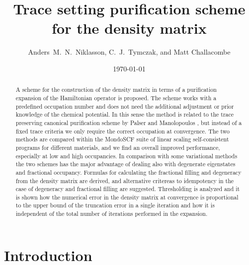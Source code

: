
\draft
\tighten
\twocolumn



\date{\today}

\title{Trace setting purification scheme for the density matrix}

\author{Anders~M.~N.~Niklasson, C.~J.~Tymczak, and Matt Challacombe}

\address{
Theoretical Division, Los Alamos National Laboratory,
Los Alamos, NM 87545, USA}

\maketitle

\begin{abstract}
A scheme for the construction of the density matrix in terms of
a purification expansion of the Hamiltonian operator is proposed. The scheme
works with a predefined occupation number and does not need
the additional adjustment or prior knowledge of the chemical potential.
In this sense the method is related to the trace preserving canonical 
purification scheme by Palser and Manolopoulos \cite{McWeeny60,Palser98}, 
but instead of a fixed trace criteria we only require the correct
occupation at convergence. The two methods are
compared within the MondoSCF suite of linear scaling self-consistent
programs for different materials, and we find an overall improved performance,
especially at low and high occupancies. In comparison
with some variational methods the two schemes has the major advantage of
dealing also with degenerate eigenstates and fractional occupancy. 
Formulas for calculating the fractional filling and degeneracy from 
the density matrix are derived, and alternative critereas to idempotency
in the case of degeneracy and fractional filling are suggested.
Thresholding is analyzed and it is shown how the numerical error 
in the density matrix at convergence is proportional to the upper bound of 
the truncation error in a single iteration and how it is independent of the total 
number of iterations performed in the expansion. 


\end{abstract}


\section{Introduction}

